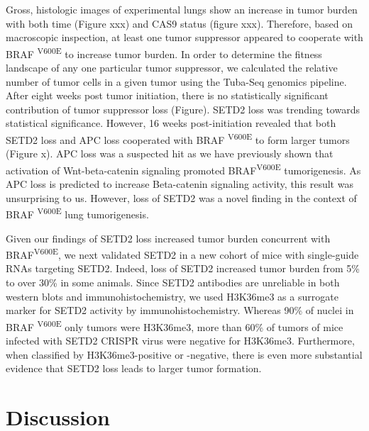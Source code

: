 Gross, histologic images of experimental lungs show an increase in tumor burden with both time (Figure xxx) and CAS9 status (figure xxx).
Therefore, based on macroscopic inspection, at least one tumor suppressor appeared to cooperate with BRAF \textsuperscript{V600E} to increase tumor burden.
In order to determine the fitness landscape of any one particular tumor suppressor, we calculated the relative number of tumor cells in a given tumor using the Tuba-Seq genomics pipeline.
After eight weeks post tumor initiation, there is no statistically significant contribution of tumor suppressor loss (Figure).
SETD2 loss was trending towards statistical significance.
However, 16 weeks post-initiation revealed that both SETD2 loss and APC loss cooperated with BRAF \textsuperscript{V600E} to form larger tumors (Figure x).
APC loss was a suspected hit as we have previously shown that activation of Wnt-beta-catenin signaling promoted BRAF\textsuperscript{V600E} tumorigenesis.
As APC loss is predicted to increase Beta-catenin signaling activity, this result was unsurprising to us.
However, loss of SETD2 was a novel finding in the context of BRAF \textsuperscript{V600E} lung tumorigenesis.

Given our findings of SETD2 loss increased tumor burden concurrent with BRAF\textsuperscript{V600E}, we next validated SETD2 in a new cohort of mice with single-guide RNAs targeting SETD2.
Indeed, loss of SETD2 increased tumor burden from 5\% to over 30\% in some animals.
Since SETD2 antibodies are unreliable in both western blots and immunohistochemistry, we used H3K36me3 as a surrogate marker for SETD2 activity by immunohistochemistry.
Whereas 90\% of nuclei in BRAF \textsuperscript{V600E} only tumors were H3K36me3, more than 60\% of tumors of mice infected with SETD2 CRISPR virus were negative for H3K36me3.
Furthermore, when classified by H3K36me3-positive or -negative, there is even more substantial evidence that SETD2 loss leads to larger tumor formation.

\hypertarget{discussion}{%
\section{Discussion}\label{discussion}}


